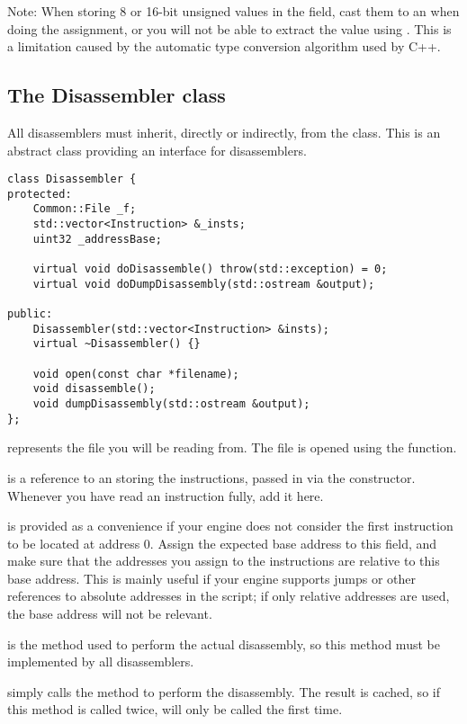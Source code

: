 Note: When storing 8 or 16-bit unsigned values in the  field, cast them to an  when doing the assignment, or you will not be able to extract the value using . This is a limitation caused by the automatic type conversion algorithm used by C++.

\subsection{The Disassembler class}
All disassemblers must inherit, directly or indirectly, from the  class. This is an abstract class providing an interface for disassemblers.

\begin{C++}
\begin{lstlisting}
class Disassembler {
protected:
	Common::File _f;
	std::vector<Instruction> &_insts;
	uint32 _addressBase;

	virtual void doDisassemble() throw(std::exception) = 0;
	virtual void doDumpDisassembly(std::ostream &output);

public:
	Disassembler(std::vector<Instruction> &insts);
	virtual ~Disassembler() {}

	void open(const char *filename);
	void disassemble();
	void dumpDisassembly(std::ostream &output);
};
\end{lstlisting}
\end{C++}

 represents the file you will be reading from. The file is opened using the  function.

 is a reference to an  storing the instructions, passed in via the constructor. Whenever you have read an instruction fully, add it here.

 is provided as a convenience if your engine does not consider the first instruction to be located at address 0. Assign the expected base address to this field, and make sure that the addresses you assign to the instructions are relative to this base address. This is mainly useful if your engine supports jumps or other references to absolute addresses in the script; if only relative addresses are used, the base address will not be relevant.

 is the method used to perform the actual disassembly, so this method must be implemented by all disassemblers.

 simply calls the  method to perform the disassembly. The result is cached, so if this method is called twice,  will only be called the first time.

